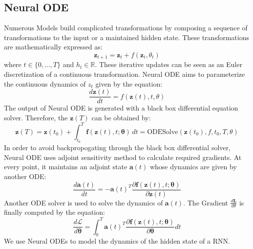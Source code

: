 \documentclass[12pt]{article}
\begin{document}
		\subsection{Neural ODE}
			\small{Numerous Models build complicated transformations by composing a sequence of
			transformations to the input or a maintained hidden state. These transformations are mathematically expressed as:
			\begin{equation*}
				\mathbf{z}_{t+1} = \mathbf{z}_{t} + f(\mathbf{z}_{t}, \theta_{t})
			\end{equation*}
			where $t \in \{0, \dots, T \}$ and $h_{t} \in \mathbb{R}$. These iterative
			updates can be seen as an Euler discretization of a continuous transformation. Neural ODE aims to parameterize the continuous dynamics of $z_{t}$ given by the equation:
			\begin{equation*}
				\frac{d\mathbf{z}(t)}{dt} = f(\mathbf{z}(t), t, \theta) 
			\end{equation*}
			The output of Neural ODE is generated with a black box differential equation solver. Therefore, the $\mathbf{z}(T)$ can be obtained by:
			\begin{equation*}
				\mathbf{z}(T) = \mathbf{z}(t_0) + \int_{t_{0}}^T \mathbf{f}(\mathbf{z}(t), t; \mathbf{\theta}) \, dt = \text{ODESolve}(\mathbf{z}(t_0), f, t_0, T, \theta)
			\end{equation*}
			In order to avoid backpropogating through the black box differential solver, Neural ODE uses adjoint sensitivity method to calculate required gradients. At every point, it maintains an adjoint state $\mathbf{a}(t)$ whose dynamics are given by another ODE:
			\begin{equation*}
				\frac{d\mathbf{a}(t)}{dt} = -\mathbf{a}(t)^T \frac{\partial \mathbf{f}(\mathbf{z}(t), t; \mathbf{\theta})}{\partial \mathbf{z}(t)}
			\end{equation*}
			Another ODE solver is used to solve the dynamics of $\mathbf{a}(t)$.
			The Gradient $\frac{d\mathbf{L}}{d\theta}$ is finally computed by the equation:
			\begin{equation*}
				\frac{d\mathcal{L}}{d\mathbf{\theta}} = \int_0^T \mathbf{a}(t)^T \frac{\partial \mathbf{f}(\mathbf{z}(t), t; \mathbf{\theta})}{\partial \mathbf{\theta}} dt
			\end{equation*}
			We use Neural ODEs to model the dynamics of the hidden state of a RNN.}
\end{document}
